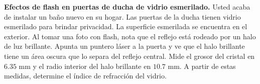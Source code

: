 \item \textbf{Efectos de flash en puertas de ducha de vidrio esmerilado.}
Usted acaba de instalar un baño nuevo en su hogar. Las puertas de la ducha tienen vidrio esmerilado para brindar privacidad. La superficie esmerilada se encuentra en el exterior. Al tomar una foto con flash, nota que el reflejo está rodeado por un halo de luz brillante. Apunta un puntero láser a la puerta y ve que el halo brillante tiene un área oscura que lo separa del reflejo central. Mide el grosor del cristal en $6.35\text{ mm}$ y el radio interior del halo brillante en $10.7\text{ mm}$. A partir de estas medidas, determine el índice de refracción del vidrio.